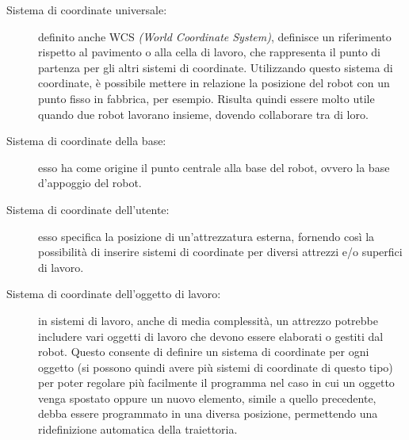 \begin{description}
	\item[Sistema di coordinate universale:] definito anche WCS \emph{(World Coordinate System)}, definisce un riferimento rispetto al pavimento o alla cella di lavoro, che rappresenta il punto di partenza per gli altri sistemi di coordinate. Utilizzando questo sistema di coordinate, è possibile mettere in relazione la posizione del robot con un	punto fisso in fabbrica, per esempio. 
	Risulta quindi essere molto utile quando due robot lavorano insieme, dovendo collaborare tra di loro.
	
	\item[Sistema di coordinate della base:] esso ha come origine il punto centrale alla base del robot, ovvero la base d'appoggio del robot.
	
	\item[Sistema di coordinate dell'utente:] esso specifica la posizione di un'attrezzatura esterna, fornendo così la possibilità di inserire sistemi di	coordinate 	per diversi attrezzi e/o superfici di lavoro. 
	
	\item[Sistema di coordinate dell'oggetto di lavoro:] in sistemi di lavoro, anche di media complessità, un attrezzo potrebbe includere vari oggetti di lavoro che devono essere elaborati o gestiti dal robot.	
	Questo	consente di definire un sistema di coordinate per ogni oggetto (si possono quindi avere più sistemi di coordinate di questo tipo) per poter regolare
	più facilmente il programma nel caso in cui un oggetto venga spostato oppure un
	nuovo elemento, simile a quello precedente, debba essere programmato in una diversa posizione, permettendo una ridefinizione automatica della traiettoria. 
	

\end{description}
